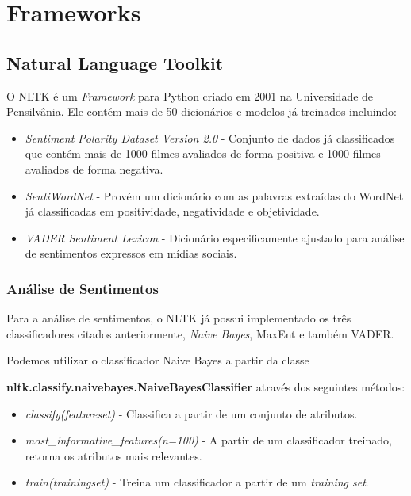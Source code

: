 \chapter{Frameworks}
\label{cap:Frameworks}

\section{Natural Language Toolkit}

O \ac{NLTK} é um \textit{Framework} para Python
criado em 2001 na Universidade de Pensilvânia. Ele contém mais de 50 dicionários
e modelos já treinados incluindo:

\begin{itemize}
  \item \textit{Sentiment Polarity Dataset Version 2.0} - Conjunto de dados já
  classificados que contém mais de 1000 filmes avaliados de forma positiva e
  1000 filmes avaliados de forma negativa.
  \item \textit{SentiWordNet} - Provém um dicionário com as palavras extraídas
  do WordNet já classificadas em positividade, negatividade e objetividade.
  \item \textit{VADER Sentiment Lexicon} - Dicionário especificamente ajustado
  para análise de sentimentos expressos em mídias sociais.
\end{itemize}


\subsection{Análise de Sentimentos}

Para a análise de sentimentos, o \ac{NLTK} já possui implementado os três
classificadores citados anteriormente, \textit{Naive Bayes},
\ac{MaxEnt} e também \ac{VADER}.

Podemos utilizar o classificador Naive Bayes a partir da classe

\textbf{nltk.classify.naivebayes.NaiveBayesClassifier} através dos seguintes métodos:

\begin{itemize}
  \item \textit{classify(featureset)} - Classifica a partir de um conjunto de
  atributos.
  \item \textit{most\_informative\_features(n=100)} - A partir de um
  classificador treinado, retorna os atributos mais relevantes.
  \item \textit{train(trainingset)} - Treina um classificador a partir de um \textit{training set}.
\end{itemize}

